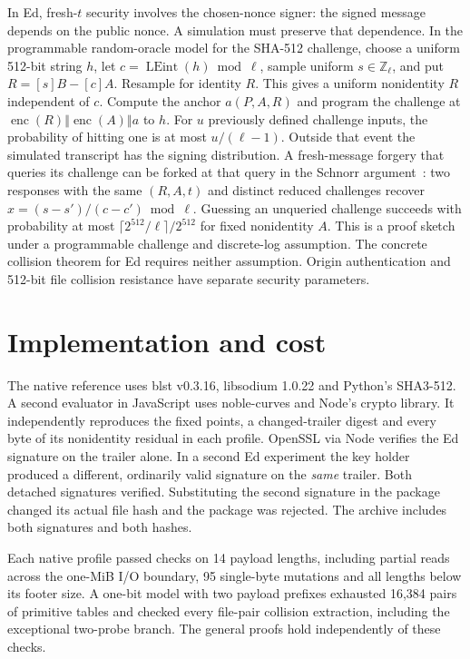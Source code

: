 \documentclass[10pt,twocolumn,letterpaper]{article}
\newcommand{\cat}{\mathbin\Vert}
\newcommand{\enc}{\operatorname{enc}}
\begin{document}
In Ed, fresh-$t$ security involves the chosen-nonce signer: the signed message depends on the public nonce. A simulation must preserve that dependence. In the programmable random-oracle model for the SHA-512 challenge, choose a uniform 512-bit string $h$, let $c=\operatorname{LEint}(h)\bmod\ell$, sample uniform $s\in\mathbb Z_\ell$, and put $R=[s]B-[c]A$. Resample for identity $R$. This gives a uniform nonidentity $R$ independent of $c$. Compute the anchor $a(P,A,R)$ and program the challenge at $\enc(R)\cat\enc(A)\cat a$ to $h$. For $u$ previously defined challenge inputs, the probability of hitting one is at most $u/(\ell-1)$. Outside that event the simulated transcript has the signing distribution. A fresh-message forgery that queries its challenge can be forked at that query in the Schnorr argument~\cite{fork}: two responses with the same $(R,A,t)$ and distinct reduced challenges recover $x=(s-s')/(c-c')\bmod\ell$. Guessing an unqueried challenge succeeds with probability at most $\lceil 2^{512}/\ell\rceil/2^{512}$ for fixed nonidentity $A$. This is a proof sketch under a programmable challenge and discrete-log assumption. The concrete collision theorem for Ed requires neither assumption. Origin authentication and 512-bit file collision resistance have separate security parameters.

\section{Implementation and cost}
The native reference uses blst v0.3.16, libsodium 1.0.22 and Python's SHA3-512. A second evaluator in JavaScript uses noble-curves and Node's crypto library. It independently reproduces the fixed points, a changed-trailer digest and every byte of its nonidentity residual in each profile. OpenSSL via Node verifies the Ed signature on the trailer alone. In a second Ed experiment the key holder produced a different, ordinarily valid signature on the \emph{same} trailer. Both detached signatures verified. Substituting the second signature in the package changed its actual file hash and the package was rejected. The archive includes both signatures and both hashes.

Each native profile passed checks on 14 payload lengths, including partial reads across the one-MiB I/O boundary, 95 single-byte mutations and all lengths below its footer size. A one-bit model with two payload prefixes exhausted 16,384 pairs of primitive tables and checked every file-pair collision extraction, including the exceptional two-probe branch. The general proofs hold independently of these checks.
\end{document}
